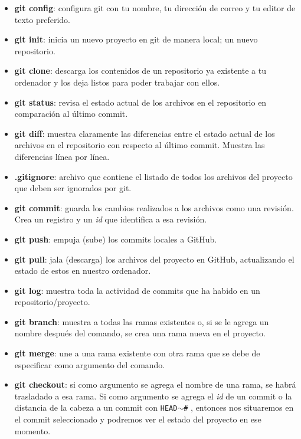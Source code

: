 \documentclass[10pt,letterpaper]{article}
\newcommand{\inlinecode}[1]{
\colorbox{light-gray}{\texttt{#1}}
}
\begin{document}
\begin{small}
\begin{itemize}
\item \textbf{git config}: configura git con tu nombre, tu direcci\'on de correo y tu editor de texto preferido.
\item \textbf{git init}: inicia un nuevo proyecto en git de manera local; un nuevo repositorio.
\item \textbf{git clone}: descarga los contenidos de un repositorio ya existente a tu ordenador y los deja listos para poder trabajar con ellos.
\item \textbf{git status}: revisa el estado actual de los archivos en el repositorio en comparaci\'on al \'ultimo commit.
\item \textbf{git diff}: muestra claramente las diferencias entre el estado actual de los archivos en el repositorio con respecto al \'ultimo commit. Muestra las diferencias l\'inea por l\'inea.
\item \textbf{.gitignore}: archivo que contiene el listado de todos los archivos del proyecto que deben ser ignorados por git.
\item \textbf{git commit}: guarda los cambios realizados a los archivos como una revisi\'on. Crea un registro y un \emph{id} que identifica a esa revisi\'on.
\item \textbf{git push}: empuja (sube) los commits locales a GitHub.
\item \textbf{git pull}: jala (descarga) los archivos del proyecto en GitHub, actualizando el estado de estos en nuestro ordenador.
\item \textbf{git log}: muestra toda la actividad de commits que ha habido en un repositorio/proyecto.
\item \textbf{git branch}: muestra a todas las ramas existentes o, si se le agrega un nombre despu\'es del comando, se crea una rama nueva en el proyecto.
\item \textbf{git merge}: une a una rama existente con otra rama que se debe de especificar como argumento del comando.
\item \textbf{git checkout}: si como argumento se agrega el nombre de una rama, se habr\'a trasladado a esa rama. Si como argumento se agrega el \emph{id} de un commit o la distancia de la cabeza a un commit con \inlinecode{HEAD$\sim$\#}, entonces nos situaremos en el commit seleccionado y podremos ver el estado del proyecto en ese momento.
\end{itemize}
\end{small}
\end{document}
